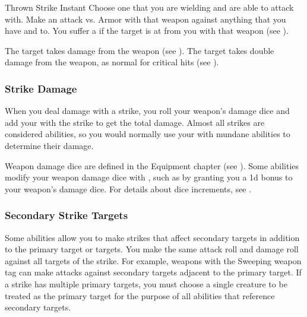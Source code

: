         \begin{instantability}{Thrown Strike}
            \label{Thrown Strike}
            Instant
            \rankline
            Choose one  that you are wielding and are able to attack with.
            Make an attack vs. Armor with that weapon against anything that you have  and  to.
            You suffer a  if the target is at  from you with that weapon (see ).

            \hit The target takes damage from the weapon (see ).
            \crit The target takes double damage from the weapon, as normal for critical hits (see ).
        \end{instantability}

        \subsubsection{Strike Damage}\label{Strike Damage}
            When you deal damage with a strike, you roll your weapon's damage dice and add your  with the strike to get the total damage.
            Almost all strikes are considered  abilities, so you would normally use your  with mundane abilities to determine their damage.

            Weapon damage dice are defined in the Equipment chapter (see ).
            Some abilities modify your weapon damage dice with , such as by granting you a \plus1d bonus to your weapon's damage dice.
            For details about dice increments, see .

        \subsubsection{Secondary Strike Targets}\label{Secondary Strike Targets}
            Some abilities allow you to make strikes that affect secondary targets in addition to the primary target or targets.
            You make the same attack roll and damage roll against all targets of the strike.
            For example, weapons with the Sweeping weapon tag can make attacks against secondary targets adjacent to the primary target.
            If a strike has multiple primary targets, you must choose a single creature to be treated as the primary target for the purpose of all abilities that reference secondary targets.

